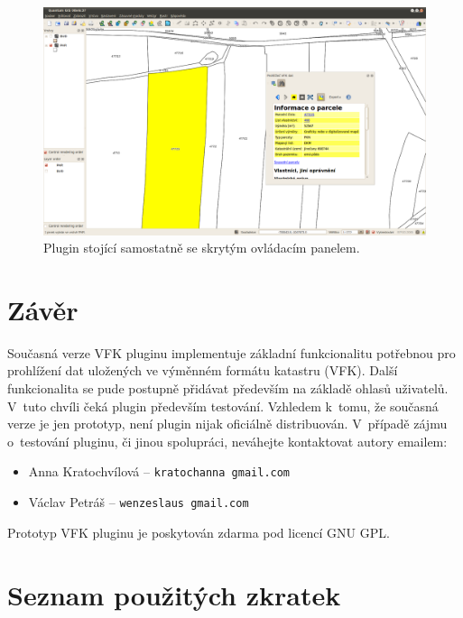 \documentclass[a4paper,12pt]{article}
\begin{document}
\begin{figure}[h!]
\centering
\includegraphics[width=\textwidth]{./screenshoty/Quantum_GIS_08e6c37_039.png}
\caption{Plugin stojící samostatně se skrytým ovládacím panelem.}
\label{fig:screenshot3}
\end{figure}
\clearpage
\section{Závěr}
Současná verze VFK pluginu implementuje základní funkcionalitu potřebnou pro prohlížení dat uložených ve výměnném formátu katastru (VFK).
Další funkcionalita se pude postupně přidávat především na základě ohlasů uživatelů.
V~tuto chvíli čeká plugin především testování.
Vzhledem k~tomu, že současná verze je jen prototyp, není plugin nijak oficiálně distribuován.
V~případě zájmu o~testování pluginu, či jinou spolupráci, neváhejte kontaktovat autory emailem:
    \begin{itemize}
    \item Anna Kratochvílová -- \verb|kratochanna gmail.com|
    \item Václav Petráš -- \verb|wenzeslaus gmail.com|
    \end{itemize}
Prototyp VFK pluginu je poskytován zdarma pod licencí GNU GPL.

\newpage
\section*{Seznam použitých zkratek}
\end{document}
